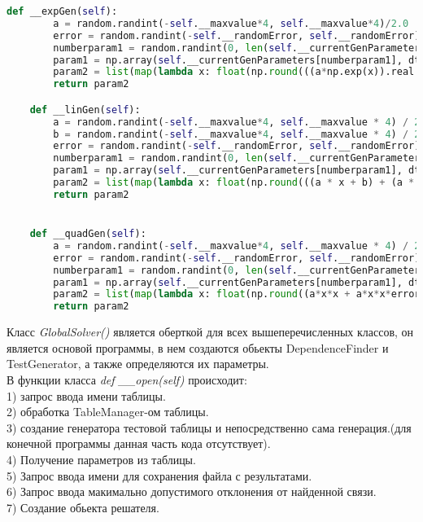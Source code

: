     \begin{lstlisting}[language=Python]
    def __expGen(self):
        a = random.randint(-self.__maxvalue*4, self.__maxvalue*4)/2.0
        error = random.randint(-self.__randomError, self.__randomError)/100.0
        numberparam1 = random.randint(0, len(self.__currentGenParameters)-1)
        param1 = np.array(self.__currentGenParameters[numberparam1], dtype=np.float128)
        param2 = list(map(lambda x: float(np.round(((a*np.exp(x)).real + (a*np.exp(x)*error).real), 3)), param1))
        return param2

    def __linGen(self):
        a = random.randint(-self.__maxvalue*4, self.__maxvalue * 4) / 2.0
        b = random.randint(-self.__maxvalue*4, self.__maxvalue * 4) / 2.0
        error = random.randint(-self.__randomError, self.__randomError) / 100.0
        numberparam1 = random.randint(0, len(self.__currentGenParameters) - 1)
        param1 = np.array(self.__currentGenParameters[numberparam1], dtype=np.float128)
        param2 = list(map(lambda x: float(np.round(((a * x + b) + (a * x +b) * error), 3)), param1))
        return param2


    def __quadGen(self):
        a = random.randint(-self.__maxvalue*4, self.__maxvalue * 4) / 2.0
        error = random.randint(-self.__randomError, self.__randomError) / 100.0
        numberparam1 = random.randint(0, len(self.__currentGenParameters) - 1)
        param1 = np.array(self.__currentGenParameters[numberparam1], dtype=np.float128)
        param2 = list(map(lambda x: float(np.round((a*x*x + a*x*x*error), 3)), param1))
        return param2
    \end{lstlisting}

    Класс \textit{GlobalSolver()} является оберткой для всех вышеперечисленных классов, он является основой программы, в нем создаются обьекты DependenceFinder и TestGenerator, а также определяются их параметры.\\

    В функции класса \textit{def \_\_open(self)} происходит:\\

    1) запрос ввода имени таблицы.\\
    2) обработка TableManager-ом таблицы.\\
    3) создание генератора тестовой таблицы и непосредственно сама генерация.(для конечной программы данная часть кода отсутствует).\\
    4) Получение параметров из таблицы.\\
    5) Запрос ввода имени для сохранения файла с результатами.\\
    6) Запрос ввода макимально допустимого отклонения от найденной связи.\\
    7) Создание обьекта решателя.\\

